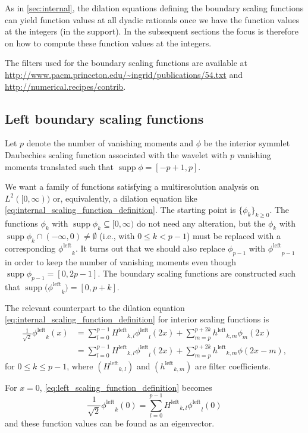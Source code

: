 \documentclass[a4paper]{scrartcl}
\newcommand\lphi{\ensuremath{\phi^{\text{left}}}}
\newcommand\lH{\ensuremath{H^{\text{left}}}}
\newcommand\lh{\ensuremath{h^{\text{left}}}}
\DeclareMathOperator\supp{supp}
\begin{document}
As in \cref{sec:internal}, the dilation equations defining the boundary scaling functions can yield function values at all dyadic rationals once we have the function values at the integers (in the support).
In the subsequent sections the focus is therefore on how to compute these function values at the integers.

The filters used for the boundary scaling functions are available at \url{http://www.pacm.princeton.edu/~ingrid/publications/54.txt} and \url{http://numerical.recipes/contrib}.


\subsection{Left boundary scaling functions}

Let $p$ denote the number of vanishing moments and $\phi$ be the interior symmlet Daubechies scaling function associated with the wavelet with $p$ vanishing moments translated such that $\supp\phi = [-p+1, p]$.

We want a family of functions satisfying a multiresolution analysis on $L^2([0,\infty))$ or, equivalently, a dilation equation like \cref{eq:internal_scaling_function_definition}.
The starting point is $\{\phi_k\}_{k\geq 0}$.
The functions $\phi_k$ with $\supp\phi_k \subseteq [0,\infty)$ do not need any alteration, but the $\phi_k$ with $\supp\phi_k \cap (-\infty,0) \neq \emptyset$ (i.e., with $0\leq k < p-1$) must be replaced with a corresponding $\lphi_k$.
It turns out that we should also replace $\phi_{p-1}$ with $\lphi_{p-1}$ in order to keep the number of vanishing moments even though $\supp\phi_{p-1} = [0,2p-1]$.
The boundary scaling functions are constructed such that $\supp\bigl(\lphi_k\bigr) = [0,p+k]$.

The relevant counterpart to the dilation equation \cref{eq:internal_scaling_function_definition} for interior scaling functions is
\begin{align}
	\frac1{\sqrt2} \lphi_k(x)
	& = \sum_{l=0}^{p-1} \lH_{k,l} \lphi_l(2x) + \sum_{m=p}^{p+2k} \lh_{k,m} \phi_m(2x)
	\nonumber
	\\
	& = \sum_{l=0}^{p-1} \lH_{k,l} \lphi_l(2x) + \sum_{m=p}^{p+2k} \lh_{k,m} \phi(2x-m),
	\label{eq:left_scaling_function_definition}
\end{align}
for $0\leq k\leq p-1$, where $(\lH_{k,l})$ and $(\lh_{k,m})$ are filter coefficients.

For $x=0$, \eqref{eq:left_scaling_function_definition} becomes
\begin{equation*}
	\frac1{\sqrt2} \lphi_k(0)
	= \sum_{l=0}^{p-1} \lH_{k,l} \lphi_l(0)
\end{equation*}
and these function values can be found as an eigenvector.
\end{document}
